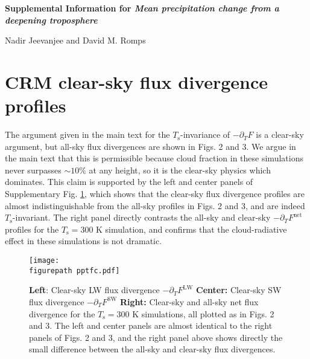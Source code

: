 \documentclass[11pt]{article}
\newcommand{\jump}{\vspace{0.5cm}}
\newcommand{\ppt}{\ensuremath{\partial_T}}
\newcommand{\FLW}{\ensuremath{F^\mathrm{LW}}}
\newcommand{\FSW}{\ensuremath{F^\mathrm{SW}}}
\newcommand{\Fnet}{\ensuremath{F^\mathrm{net}}}
\newcommand{\Ts}{\ensuremath{T_\mathrm{s}}}
\newcommand{\figurepath}{../../figures/}
\begin{document}
\begin{center}
 \Large{ \bf  Supplemental Information for \emph{Mean precipitation change from a deepening troposphere} }

\jump
\large{Nadir Jeevanjee and David M. Romps}
\end{center}

\section{CRM clear-sky flux divergence profiles}
The argument given in the main text for the \Ts-invariance of $-\ppt F$ is a clear-sky argument, but all-sky flux divergences are shown in Figs. 2 and 3. We argue in the main text that this is permissible because cloud fraction in these simulations never surpasses $\sim 10 \%$ at any height, so it is the clear-sky physics which dominates. This claim is supported by the left and center panels of Supplementary Fig. \ref{pptfc}, which shows that the clear-sky flux divergence profiles are almost indistinguishable from the all-sky profiles in Figs. 2 and 3, and are indeed  \Ts-invariant. The right panel directly contrasts the all-sky and clear-sky $-\ppt \Fnet$ profiles for the $\Ts=300$ K simulation, and confirms that the cloud-radiative effect in these simulations is not dramatic. 

\begin{figure}[h]
        \begin{center}
                        \texttt{[image: \\figurepath pptfc.pdf]}
                \caption{\textbf{Left}: Clear-sky LW flux divergence  $-\ppt \FLW$ \textbf{Center:} Clear-sky SW flux divergence  $-\ppt \FSW$  \textbf{Right:} Clear-sky and all-sky  net flux divergence for the $\Ts=300$ K simulations, all plotted as in Figs. 2 and 3. The left and center panels are almost identical to the right panels of Figs. 2 and 3, and the right panel above shows directly the small difference between the all-sky and clear-sky flux divergences. 
                \label{pptfc}
                }
        \end{center}
\end{figure}
\end{document}
